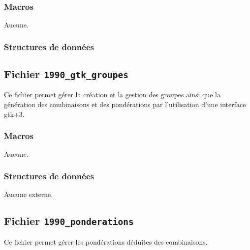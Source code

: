 \documentclass{article}
\begin{document}
\subsubsection{Macros}
Aucune.
\subsubsection{Structures de données}

























\subsection{Fichier {\texttt{1990\_gtk\_groupes}}}
Ce fichier permet gérer la création et la gestion des groupes ainsi que la génération des combinaisons et des pondérations par l'utilisation d'une interface gtk+3.
\subsubsection{Macros}
Aucune.
\subsubsection{Structures de données}
Aucune externe.


\subsection{Fichier {\texttt{1990\_ponderations}}}
Ce fichier permet gérer les pondérations déduites des combinaisons.
\end{document}

